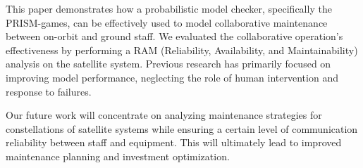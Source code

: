 This paper demonstrates how a probabilistic model checker, specifically the PRISM-games, can be effectively used to model collaborative maintenance between on-orbit and ground staff. We evaluated the collaborative operation's effectiveness by performing a RAM (Reliability, Availability, and Maintainability) analysis on the satellite system. Previous research has primarily focused on improving model performance, neglecting the role of human intervention and response to failures.

Our future work will concentrate on analyzing maintenance strategies for constellations of satellite systems while ensuring a certain level of communication reliability between staff and equipment. This will ultimately lead to improved maintenance planning and investment optimization.